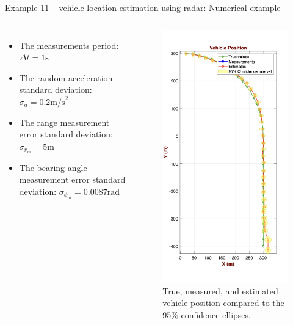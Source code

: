 \begin{frame}{Example 11 – vehicle location estimation using radar: Numerical example}
\vspace{-10pt}
\begin{columns}
\begin{itemize}
    \item The measurements period: \(\Delta t = 1\text{s}\)
    \item The random acceleration standard deviation: \(\sigma_a = 0.2\text{m/s}^2\)
    \item The range measurement error standard deviation: \(\sigma_{r_m} = 5\text{m}\)
    \item The bearing angle measurement error standard deviation: \(\sigma_{\phi_m} = 0.0087\text{rad}\)
\end{itemize}
\vspace{-15pt}
\begin{figure}
    \centering
    \includegraphics[width=0.45\linewidth]{Figures//Part3/ex11_VehiclePosition.png}
    \vspace{-15pt}
    \caption{True, measured, and estimated vehicle position
compared to the 95\% confidence ellipses.}
    \label{fig:ex11_Position}
\end{figure}


\end{columns}
\end{frame}
